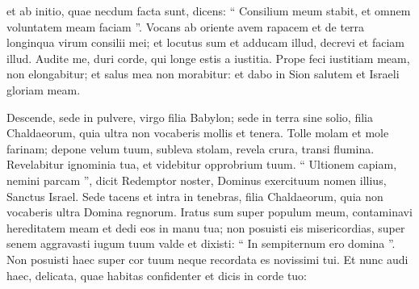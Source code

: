 \begin{biblechapter}
\begin{biblechapter}
\begin{biblechapter}
\begin{biblechapter}
\begin{biblechapter}
\begin{biblechapter}
\begin{biblechapter}
\begin{biblechapter}
\begin{biblechapter}
\begin{biblechapter}
\begin{biblechapter}
\begin{biblechapter}
\begin{biblechapter}
\begin{biblechapter}
\begin{biblechapter}
\begin{biblechapter}
\begin{biblechapter}
\begin{biblechapter}
\begin{biblechapter}
\begin{biblechapter}
\begin{biblechapter}
\begin{biblechapter}
\begin{biblechapter}
\begin{biblechapter}
\begin{biblechapter}
\begin{biblechapter}
\begin{biblechapter}
\begin{biblechapter}
\begin{biblechapter}
\begin{biblechapter}
\begin{biblechapter}
\begin{biblechapter}
\begin{biblechapter}
\begin{biblechapter}
\begin{biblechapter}
\begin{biblechapter}
\begin{biblechapter}
\begin{biblechapter}
\begin{biblechapter}
\begin{biblechapter}
\begin{biblechapter}
\begin{biblechapter}
\begin{biblechapter}
\begin{biblechapter}
\begin{biblechapter}
\begin{biblechapter}
 et ab initio, quae necdum facta sunt,
 dicens: “ Consilium meum stabit,
 et omnem voluntatem meam faciam ”.
 \verse Vocans ab oriente avem rapacem
 et de terra longinqua virum consilii mei;
 et locutus sum et adducam illud,
 decrevi et faciam illud.
 \verse Audite me, duri corde,
 qui longe estis a iustitia.
 \verse Prope feci iustitiam meam, non elongabitur;
 et salus mea non morabitur:
 et dabo in Sion salutem
 et Israeli gloriam meam.
 
\begin{biblechapter}
\verse Descende, sede in pulvere,
 virgo filia Babylon;
 sede in terra sine solio,
 filia Chaldaeorum,
 quia ultra non vocaberis
 mollis et tenera.
 \verse Tolle molam et mole farinam;
 depone velum tuum,
 subleva stolam, revela crura,
 transi flumina.
 \verse Revelabitur ignominia tua,
 et videbitur opprobrium tuum.
 “ Ultionem capiam,
 nemini parcam ”,
 \verse dicit Redemptor noster, Dominus exercituum nomen illius,
 Sanctus Israel.
 \verse Sede tacens et intra in tenebras,
 filia Chaldaeorum,
 quia non vocaberis ultra
 Domina regnorum.
 \verse Iratus sum super populum meum,
 contaminavi hereditatem meam
 et dedi eos in manu tua;
 non posuisti eis misericordias,
 super senem aggravasti iugum tuum valde
 \verse et dixisti: “ In sempiternum ero domina ”.
 Non posuisti haec super cor tuum
 neque recordata es novissimi tui.
 \verse Et nunc audi haec, delicata,
 quae habitas confidenter
 et dicis in corde tuo:

\end{biblechapter}
\end{biblechapter}
\end{biblechapter}
\end{biblechapter}
\end{biblechapter}
\end{biblechapter}
\end{biblechapter}
\end{biblechapter}
\end{biblechapter}
\end{biblechapter}
\end{biblechapter}
\end{biblechapter}
\end{biblechapter}
\end{biblechapter}
\end{biblechapter}
\end{biblechapter}
\end{biblechapter}
\end{biblechapter}
\end{biblechapter}
\end{biblechapter}
\end{biblechapter}
\end{biblechapter}
\end{biblechapter}
\end{biblechapter}
\end{biblechapter}
\end{biblechapter}
\end{biblechapter}
\end{biblechapter}
\end{biblechapter}
\end{biblechapter}
\end{biblechapter}
\end{biblechapter}
\end{biblechapter}
\end{biblechapter}
\end{biblechapter}
\end{biblechapter}
\end{biblechapter}
\end{biblechapter}
\end{biblechapter}
\end{biblechapter}
\end{biblechapter}
\end{biblechapter}
\end{biblechapter}
\end{biblechapter}
\end{biblechapter}
\end{biblechapter}
\end{biblechapter}
